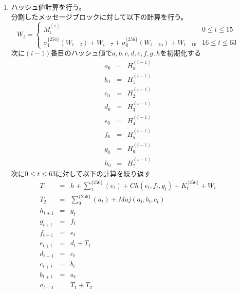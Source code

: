 \documentclass{thesis}
\begin{document}
\begin{enumerate}
\item ハッシュ値計算を行う。\\
分割したメッセージブロックに対して以下の計算を行う。
\begin{equation*}
W_t = 
\begin{cases}
M_t^{(i)} & 0 \leq t \leq 15 \\
\sigma_1^{\{256\}}(W_{t-2})+W_{t-7}+\sigma_0^{\{256\}}(W_{t-15})+W_{t-16} & 16 \leq t \leq 63
\end{cases}
\end{equation*}
次に$(i−1)$番目のハッシュ値で$a,b,c,d,e,f,g,h$を初期化する
\begin{eqnarray*}
a_0 &=& H_0^{(i-1)} \\
b_0 &=& H_1^{(i-1)} \\
c_0 &=& H_2^{(i-1)} \\
d_0 &=& H_3^{(i-1)} \\
e_0 &=& H_4^{(i-1)} \\
f_0 &=& H_5^{(i-1)} \\
g_0 &=& H_6^{(i-1)} \\
h_0 &=& H_7^{(i-1)}
\end{eqnarray*}
次に$0 \leq t \leq 63$に対して以下の計算を繰り返す
\begin{eqnarray*}
T_1 &=& h + \sum\nolimits_1^{\{256\}}(e_t) + Ch(e_t, f_t, g_t) + K_t^{\{256\}} + W_t \\
T_2 &=& \sum\nolimits_0^{\{256\}}(a_t) + Maj(a_t, b_t, c_t) \\
h_{t+1} &=& g_t \\
g_{t+1} &=& f_t \\
f_{t+1} &=& e_t \\
e_{t+1} &=& d_t + T_1 \\
d_{t+1} &=& c_t \\
c_{t+1} &=& b_t \\
b_{t+1} &=& a_t \\
a_{t+1} &=& T_1 + T_2 
\end{eqnarray*}


\end{enumerate}
\end{document}
